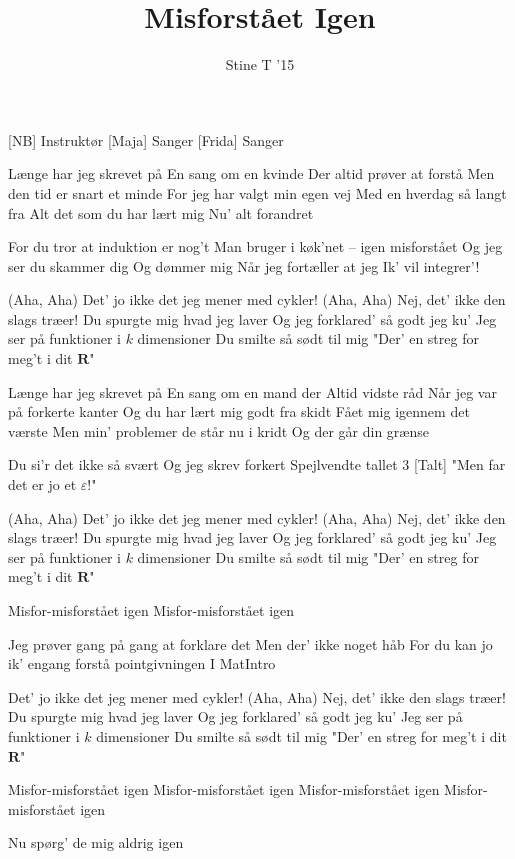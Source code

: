\documentclass[a4paper,11pt]{article}
\title{Misforstået Igen}
\author{Stine T '15}
\begin{document}
\maketitle

\begin{roles}
[NB] Instruktør
[Maja] Sanger 
[Frida] Sanger
\end{roles}

\begin{song}
 Længe har jeg skrevet på
En sang om en kvinde
Der altid prøver at forstå
Men den tid er snart et minde
 For jeg har valgt min egen vej
Med en hverdag så langt fra
Alt det som du har lært mig
Nu' alt forandret

 For du tror at induktion er nog't
Man bruger i køk'net -- igen misforstået
 Og jeg ser du skammer dig
 Og dømmer mig
 Når jeg fortæller at jeg
Ik' vil integrer'!

 (Aha, Aha) Det' jo ikke det jeg mener med cykler!
(Aha, Aha) Nej, det' ikke den slags træer!
Du spurgte mig hvad jeg laver
Og jeg forklared' så godt jeg ku'
Jeg ser på funktioner i $k$ dimensioner
Du smilte så sødt til mig
 "Der' en streg for meg't i dit $\mathbf{R}$"

 Længe har jeg skrevet på
En sang om en mand der
Altid vidste råd
Når jeg var på forkerte kanter
 Og du har lært mig godt fra skidt
Fået mig igennem det værste
Men min' problemer de står nu i kridt
Og der går din grænse

 Du si'r det ikke så svært
 Og jeg skrev forkert
 Spejlvendte tallet $3$
[Talt] "Men far det er jo et $\varepsilon$!"

 (Aha, Aha) Det' jo ikke det jeg mener med cykler!
(Aha, Aha) Nej, det' ikke den slags træer!
Du spurgte mig hvad jeg laver
Og jeg forklared' så godt jeg ku'
Jeg ser på funktioner i $k$ dimensioner
Du smilte så sødt til mig
"Der' en streg for meg't i dit $\mathbf{R}$"

 Misfor-misforstået igen
Misfor-misforstået igen

 Jeg prøver gang på gang at forklare det
Men der' ikke noget håb
 For du kan jo ik' engang forstå pointgivningen
I MatIntro

 Det' jo ikke det jeg mener med cykler!
(Aha, Aha) Nej, det' ikke den slags træer!
Du spurgte mig hvad jeg laver
Og jeg forklared' så godt jeg ku'
Jeg ser på funktioner i $k$ dimensioner
Du smilte så sødt til mig
"Der' en streg for meg't i dit $\mathbf{R}$"

 Misfor-misforstået igen
Misfor-misforstået igen
Misfor-misforstået igen
Misfor-misforstået igen

 Nu spørg' de mig aldrig igen
\end{song}
\end{document}
